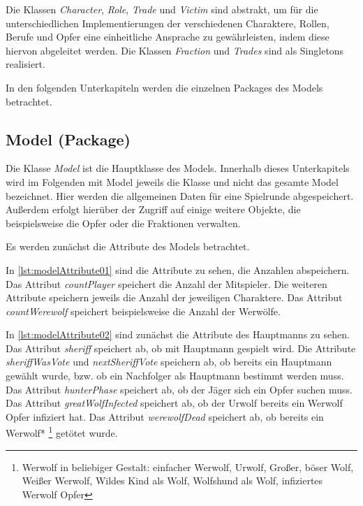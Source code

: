 \medskip
Die Klassen \textit{Character}, \textit{Role}, \textit{Trade} und \textit{Victim} sind abstrakt, um für die unterschiedlichen Implementierungen der verschiedenen Charaktere, Rollen, Berufe und Opfer eine einheitliche Ansprache zu gewährleisten, indem diese hiervon abgeleitet werden. Die Klassen \textit{Fraction} und \textit{Trades} sind als Singletons realisiert.

\medskip
In den folgenden Unterkapiteln werden die einzelnen Packages des Models betrachtet. 

\subsection{Model (Package)}
Die Klasse \textit{Model} ist die Hauptklasse des Models. Innerhalb dieses Unterkapitels wird im Folgenden mit Model jeweils die Klasse und nicht das gesamte Model bezeichnet. 
Hier werden die allgemeinen Daten für eine Spielrunde abgespeichert. Außerdem erfolgt hierüber der Zugriff auf einige weitere Objekte, die beispielsweise die Opfer oder die Fraktionen verwalten. 

Es werden zunächst die Attribute des Models betrachtet.

\medskip
\begin{center}
	\begin{minipage}{0.7\textwidth}
		
	\end{minipage}
\end{center}


In \autoref{lst:modelAttribute01} sind die Attribute zu sehen, die Anzahlen abspeichern. Das Attribut \textit{countPlayer} speichert die Anzahl der Mitspieler. Die weiteren Attribute speichern jeweils die Anzahl der jeweiligen Charaktere. Das Attribut \textit{countWerewolf} speichert beispielsweise die Anzahl der Werwölfe. 

\medskip
\begin{center}
	\begin{minipage}{0.7\textwidth}
		
	\end{minipage}
\end{center}

In \autoref{lst:modelAttribute02} sind zunächst die Attribute des Hauptmanns zu sehen. Das Attribut \textit{sheriff} speichert ab, ob mit Hauptmann gespielt wird. Die Attribute \textit{sheriffWasVote} und \textit{nextSheriffVote} speichern ab, ob bereits ein Hauptmann gewählt wurde, bzw. ob ein Nachfolger als Hauptmann bestimmt werden muss. 
Das Attribut \textit{hunterPhase} speichert ab, ob der Jäger sich ein Opfer suchen muss. 
Das Attribut \textit{greatWolfInfected} speichert ab, ob der Urwolf bereits ein Werwolf Opfer infiziert hat. 
Das Attribut \textit{werewolfDead} speichert ab, ob bereits ein Werwolf* \footnote{Werwolf in beliebiger Gestalt: einfacher Werwolf, Urwolf, Großer, böser Wolf, Weißer Werwolf, Wildes Kind als Wolf, Wolfshund als Wolf, infiziertes Werwolf Opfer} getötet wurde. 

